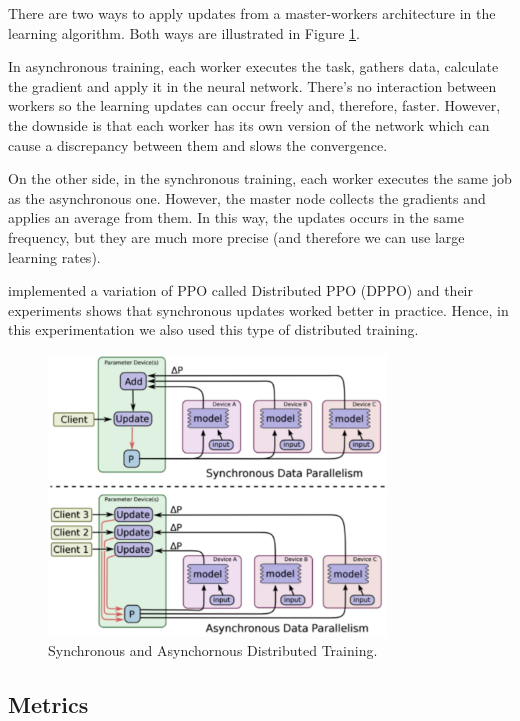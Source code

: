 There are two ways to apply updates from a master-workers architecture in the learning algorithm. Both ways are illustrated in Figure \ref{fig:distributedtraining}.

In asynchronous training, each worker executes the task, gathers data, calculate the gradient and apply it in the neural network. There's no interaction between workers so the learning updates can occur freely and, therefore, faster. However, the downside is that each worker has its own version of the network which can cause a discrepancy between them and slows the convergence.

On the other side, in the synchronous training, each worker executes the same job as the asynchronous one. However, the master node collects the gradients and applies an average from them. In this way, the updates occurs in the same frequency, but they are much more precise (and therefore we can use large learning rates). 

\cite{heess2017} implemented a variation of PPO called Distributed PPO (DPPO) and their experiments shows that synchronous updates worked better in practice. Hence, in this experimentation we also used this type of distributed training.

\begin{figure}[!htbp]
	\centering
	\includegraphics[width=0.8\textwidth]{Cap5/distributedtraining.eps}
	\caption{ Synchronous and Asynchornous Distributed Training.
	}
	\label{fig:distributedtraining}
\end{figure}

\subsection{Metrics}

